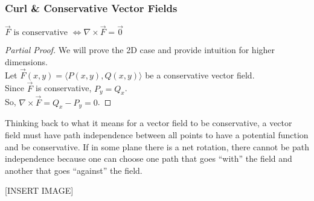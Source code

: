 \subsubsection{Curl \& Conservative Vector Fields}
\begin{theorem}
	$\vec{F}\text{ is conservative }\Leftrightarrow\nabla\times\vec{F}=\vec{0}$
\end{theorem}
\begin{proof}[Partial Proof]
	We will prove the 2D case and provide intuition for higher dimensions.\\
	Let $\vec{F}(x,y)=\langle P(x,y), Q(x,y)\rangle$ be a conservative vector field.\\
	Since $\vec{F}$ is conservative, $P_y=Q_x$.\\
	So, $\nabla\times\vec{F}=Q_x-P_y=0$.
\end{proof}
\noindent
Thinking back to what it means for a vector field to be conservative, a vector field must have path independence between all points to have a potential function and be conservative. If in some plane there is a net rotation, there cannot be path independence because one can choose one path that goes “with” the field and another that goes “against” the field.

[INSERT IMAGE]